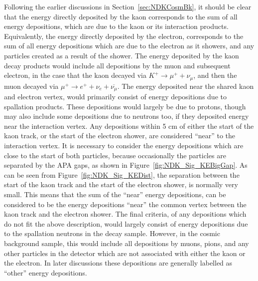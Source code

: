 Following the earlier discussions in Section~\ref{sec:NDKCosmBk}, it should be clear that the energy directly deposited by the kaon corresponds to the sum of all energy depositions, which are due to the kaon or its interaction products. Equivalently, the energy directly deposited by the electron, corresponds to the sum of all energy depositions which are due to the electron as it showers, and any particles created as a result of the shower. The energy deposited by the kaon decay products would include all depositions by the muon and subsequent electron, in the case that the kaon decayed via $K^{+} \rightarrow \mu^{+} + \nu_{\mu}$, and then the muon decayed via $\mu^{+} \rightarrow e^{+} + \nu_{e} + \overline{\nu_{\mu}}$. The energy deposited near the shared kaon and electron vertex, would primarily consist of energy depositions due to spallation products. These depositions would largely be due to protons, though may also include some depositions due to neutrons too, if they deposited energy near the interaction vertex. Any depositions within 5 cm of either the start of the kaon track, or the start of the electron shower, are considered ``near'' to the interaction vertex. It is necessary to consider the energy depositions which are close to the start of both particles, because occasionally the particles are separated by the APA gaps, as shown in Figure~\ref{fig:NDK_Sig_KEBigGap}. As can be seen from Figure~\ref{fig:NDK_Sig_KEDist}, the separation between the start of the kaon track and the start of the electron shower, is normally very small. This means that the sum of the ``near'' energy depositions, can be considered to be the energy depositions ``near'' the common vertex between the kaon track and the electron shower. The final criteria, of any depositions which do not fit the above description, would largely consist of energy depositions due to the spallation neutrons in the decay sample. However, in the cosmic background sample, this would include all depositions by muons, pions, and any other particles in the detector which are not associated with either the kaon or the electron. In later discussions these depositions are generally labelled as ``other'' energy depositions. \\

